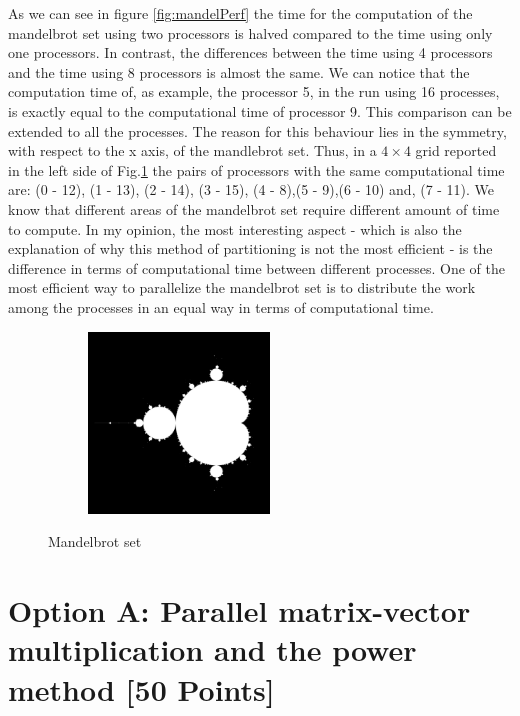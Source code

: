 \documentclass[unicode,11pt,a4paper,oneside,numbers=endperiod,openany]{scrartcl}
\begin{document}
As we can see in figure \ref{fig:mandelPerf} the time for the computation of the mandelbrot set using two processors is halved compared to the time using only one processors. In contrast, the differences between the time using 4 processors and the time using 8 processors is almost the same. We can notice that the computation time of, as example, the processor 5, in the run using 16 processes, is exactly equal to the computational time of processor 9. This comparison can be extended to all the processes. The reason for this behaviour lies in the symmetry, with respect to the x axis, of the mandlebrot set. Thus, in a $4 \times 4$ grid reported in the left side of Fig.\ref{fig:procMatrix} the pairs of processors with the same computational time are: (0 - 12), (1 - 13), (2 - 14), (3 - 15), (4 - 8),(5 - 9),(6 - 10) and, (7 - 11). We know that different areas of the mandelbrot set require different amount of time to compute. In my opinion, the most interesting aspect - which is also the explanation of why this method of partitioning is not the most efficient - is the difference in terms of computational time between different processes. One of the most efficient way to parallelize the mandelbrot set is to distribute the work among the processes in an equal way in terms of computational time.
\begin{figure}[h!]
	\centering
	\begin{subfigure}[b]{0.48\textwidth}
		\hspace{3cm}
	\end{subfigure}
	\hfill
	\begin{subfigure}[b]{0.48\textwidth}
		\includegraphics[width=0.53\textwidth]{images/mandel.png}
	\end{subfigure}
	\caption{Mandelbrot set}
	\label{fig:procMatrix}
\end{figure}


\section{Option A: Parallel matrix-vector multiplication and the power method [50 Points]}
\end{document}
